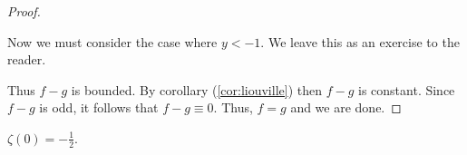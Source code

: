 \begin{proof}
\begin{enumerate}
Now we must consider the case where $y<-1$. We leave this as an exercise to the reader.
\end{enumerate}

Thus $f-g$ is bounded. By corollary (\ref{cor:liouville}) then $f-g$ is constant. Since $f-g$ is odd, it follows that $f-g \equiv 0$. Thus, $f=g$ and we are done.



\end{proof}












\begin{corollary}\label{cor:z-zero}
$\zeta(0) = - \frac{1}{2}$.
\end{corollary}

